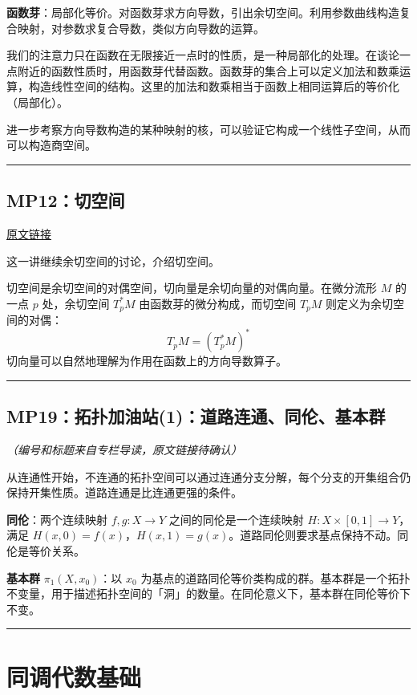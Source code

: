 \documentclass[10pt, openany]{book}
\begin{document}
\textbf{函数芽}：局部化等价。对函数芽求方向导数，引出余切空间。利用参数曲线构造复合映射，对参数求复合导数，类似方向导数的运算。

我们的注意力只在函数在无限接近一点时的性质，是一种局部化的处理。在谈论一点附近的函数性质时，用函数芽代替函数。函数芽的集合上可以定义加法和数乘运算，构造线性空间的结构。这里的加法和数乘相当于函数上相同运算后的等价化（局部化）。

进一步考察方向导数构造的某种映射的核，可以验证它构成一个线性子空间，从而可以构造商空间。

\medskip
\noindent\rule{\textwidth}{0.4pt}

\section{MP12：切空间}
\label{sec:mp12}

\href{https://zhuanlan.zhihu.com/p/44211005}{原文链接}

这一讲继续余切空间的讨论，介绍切空间。

切空间是余切空间的对偶空间，切向量是余切向量的对偶向量。在微分流形 $M$ 的一点 $p$ 处，余切空间 $T_p^*M$ 由函数芽的微分构成，而切空间 $T_pM$ 则定义为余切空间的对偶：
\[
T_pM = (T_p^*M)^*
\]
切向量可以自然地理解为作用在函数上的方向导数算子。

\medskip
\noindent\rule{\textwidth}{0.4pt}

\section{MP19：拓扑加油站(1)：道路连通、同伦、基本群}
\label{sec:mp19}

\textit{（编号和标题来自专栏导读，原文链接待确认）}

从连通性开始，不连通的拓扑空间可以通过连通分支分解，每个分支的开集组合仍保持开集性质。道路连通是比连通更强的条件。

\textbf{同伦}：两个连续映射 $f, g: X \to Y$ 之间的同伦是一个连续映射 $H: X \times [0,1] \to Y$，满足 $H(x,0) = f(x)$，$H(x,1) = g(x)$。道路同伦则要求基点保持不动。同伦是等价关系。

\textbf{基本群} $\pi_1(X, x_0)$：以 $x_0$ 为基点的道路同伦等价类构成的群。基本群是一个拓扑不变量，用于描述拓扑空间的「洞」的数量。在同伦意义下，基本群在同伦等价下不变。

\medskip
\noindent\rule{\textwidth}{0.4pt}

\chapter{同调代数基础}
\end{document}
